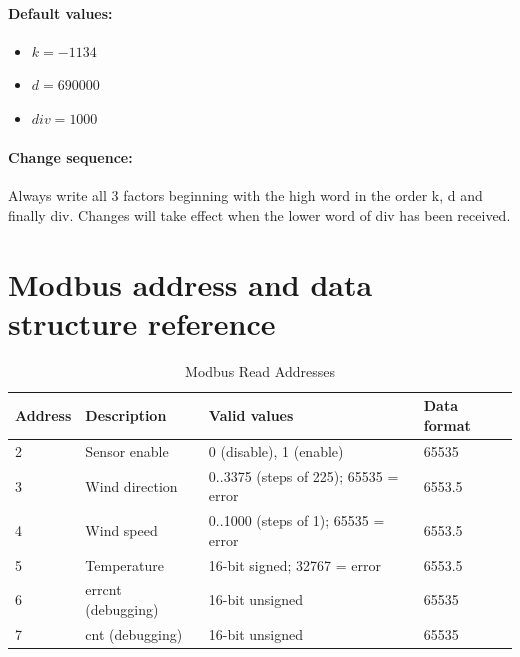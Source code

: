 \paragraph{Default values:}
\begin{itemize}
\item $k = -1134  $
\item $d = 690000 $
\item $div = 1000 $
\end{itemize}

\paragraph{Change sequence: }Always write all 3 factors beginning with the high word in the order k, d and finally div. Changes will take effect when the lower word of div has been received.

\section{Modbus address and data structure reference}
\label{sec:modbus_address_ref}

\begin{table}[ht]
    \centering
    \begin{tabular}{|l|l|l|l|}
    \hline \textbf{Address} & \textbf{Description} & \textbf{Valid values} & \textbf{Data format} \\ 
    \hline
    \hline 2 & Sensor enable & 0 (disable), 1 (enable) & 65535 \\ 
    \hline 3 & Wind direction & 0..3375 (steps of 225); 65535 = error & 6553.5 \\ 
    \hline 4 & Wind speed & 0..1000 (steps of 1); 65535 = error & 6553.5 \\ 
    \hline 5 & Temperature & 16-bit signed; 32767 = error & 6553.5 \\ 
    \hline 6 & errcnt (debugging) & 16-bit unsigned & 65535 \\ 
    \hline 7 & cnt (debugging) & 16-bit unsigned & 65535 \\ 
    \hline 
    \end{tabular}
    \caption{Modbus Read Addresses}
\end{table}

